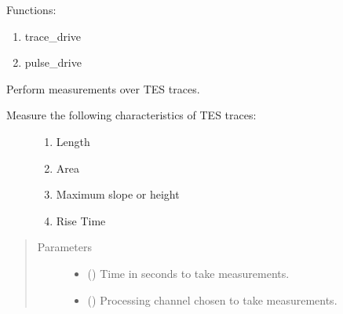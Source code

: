 \documentclass[letterpaper,10pt,english]{sphinxmanual}
\begin{document}
\sphinxAtStartPar
Functions:
\begin{enumerate}
%
\item {} 
\sphinxAtStartPar
trace\_drive

\item {} 
\sphinxAtStartPar
pulse\_drive

\end{enumerate}

\begin{fulllineitems}
\label{\detokenize{tes:tes.data_acquisition.pulse_drive}}
\sphinxAtStartPar
Perform measurements over TES traces.
\begin{description}
\item[{Measure the following characteristics of TES traces:}] \leavevmode\begin{enumerate}
%
\item {} 
\sphinxAtStartPar
Length

\item {} 
\sphinxAtStartPar
Area

\item {} 
\sphinxAtStartPar
Maximum slope or height

\item {} 
\sphinxAtStartPar
Rise Time

\end{enumerate}

\end{description}
\begin{quote}\begin{description}
\item[{Parameters}] \leavevmode\begin{itemize}
\item {} 
\sphinxAtStartPar
{} () \textendash{} Time in seconds to take measurements.

\item {} 
\sphinxAtStartPar
{} () \textendash{} Processing channel chosen to take measurements.


\end{itemize}
\end{description}
\end{quote}
\end{fulllineitems}
\end{document}
